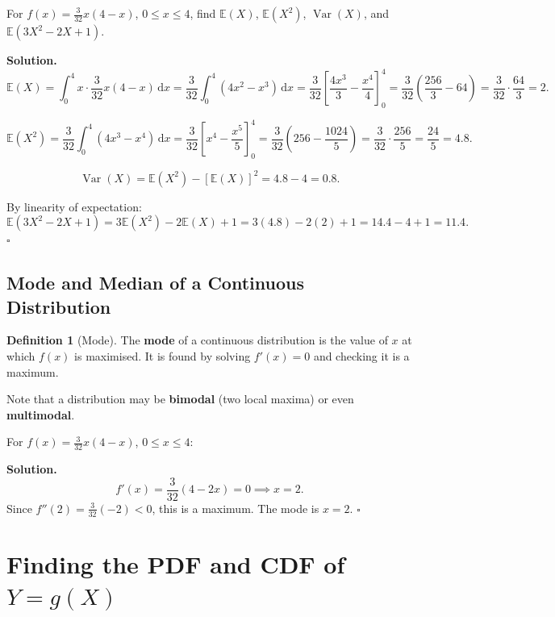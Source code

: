 \documentclass[12pt, a4paper, oneside]{book}
\theoremstyle{definition}
\newtheorem{definition}{Definition}[section]
\theoremstyle{plain}
\theoremstyle{remark}
\newcommand{\E}{\mathbb{E}}
\newcommand{\Var}{\operatorname{Var}}
\newenvironment{solution}
  {\par\medskip\noindent\textbf{Solution.}\quad}
  {\hfill$\square$\par\medskip}
\begin{document}
\begin{workedexample}
For $f(x) = \frac{3}{32}x(4-x)$, $0\le x\le 4$, find $\E(X)$,
$\E(X^2)$, $\Var(X)$, and $\E(3X^2 - 2X + 1)$.

\begin{solution}
\[
  \E(X) = \int_0^4 x\cdot\frac{3}{32}x(4-x)\,\mathrm{d}x
  = \frac{3}{32}\int_0^4 (4x^2-x^3)\,\mathrm{d}x
  = \frac{3}{32}\left[\frac{4x^3}{3}-\frac{x^4}{4}\right]_0^4
  = \frac{3}{32}\!\left(\frac{256}{3} - 64\right)
  = \frac{3}{32}\cdot\frac{64}{3} = 2.
\]

\[
  \E(X^2) = \frac{3}{32}\int_0^4 (4x^3-x^4)\,\mathrm{d}x
  = \frac{3}{32}\left[x^4 - \frac{x^5}{5}\right]_0^4
  = \frac{3}{32}\!\left(256 - \frac{1024}{5}\right)
  = \frac{3}{32}\cdot\frac{256}{5} = \frac{24}{5} = 4.8.
\]

\[
  \Var(X) = \E(X^2) - [\E(X)]^2 = 4.8 - 4 = 0.8.
\]

By linearity of expectation:
\[
  \E(3X^2-2X+1) = 3\E(X^2) - 2\E(X) + 1 = 3(4.8) - 2(2) + 1 = 14.4 - 4 + 1 = 11.4.
\]
\end{solution}
\end{workedexample}

\subsection{Mode and Median of a Continuous Distribution}

\begin{definition}[Mode]
The \textbf{mode} of a continuous distribution is the value of $x$ at which
$f(x)$ is maximised.  It is found by solving $f'(x)=0$ and checking it is a
maximum.
\end{definition}

Note that a distribution may be \textbf{bimodal} (two local maxima) or even
\textbf{multimodal}.

\begin{workedexample}
For $f(x) = \frac{3}{32}x(4-x)$, $0\le x\le 4$:
\begin{solution}
\[
  f'(x) = \frac{3}{32}(4-2x) = 0 \implies x = 2.
\]
Since $f''(2) = \frac{3}{32}(-2) < 0$, this is a maximum.  The mode is $x=2$.
\end{solution}
\end{workedexample}

\section{Finding the PDF and CDF of $Y = g(X)$}
\label{sec:transformation}
\end{document}
